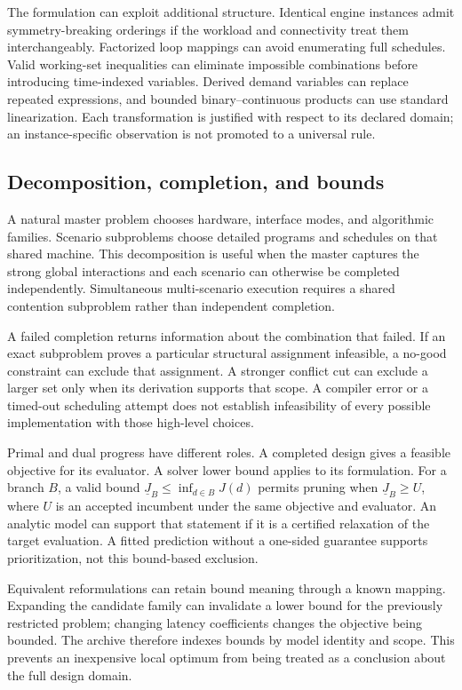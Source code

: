 The formulation can exploit additional structure. Identical engine instances admit symmetry-breaking orderings if the workload and connectivity treat them interchangeably. Factorized loop mappings can avoid enumerating full schedules. Valid working-set inequalities can eliminate impossible combinations before introducing time-indexed variables. Derived demand variables can replace repeated expressions, and bounded binary--continuous products can use standard linearization. Each transformation is justified with respect to its declared domain; an instance-specific observation is not promoted to a universal rule.

\subsection{Decomposition, completion, and bounds}
A natural master problem chooses hardware, interface modes, and algorithmic families. Scenario subproblems choose detailed programs and schedules on that shared machine. This decomposition is useful when the master captures the strong global interactions and each scenario can otherwise be completed independently. Simultaneous multi-scenario execution requires a shared contention subproblem rather than independent completion.

A failed completion returns information about the combination that failed. If an exact subproblem proves a particular structural assignment infeasible, a no-good constraint can exclude that assignment. A stronger conflict cut can exclude a larger set only when its derivation supports that scope. A compiler error or a timed-out scheduling attempt does not establish infeasibility of every possible implementation with those high-level choices.

Primal and dual progress have different roles. A completed design gives a feasible objective for its evaluator. A solver lower bound applies to its formulation. For a branch $B$, a valid bound $\underline J_B\le\inf_{d\in B}J(d)$ permits pruning when $\underline J_B\ge U$, where $U$ is an accepted incumbent under the same objective and evaluator. An analytic model can support that statement if it is a certified relaxation of the target evaluation. A fitted prediction without a one-sided guarantee supports prioritization, not this bound-based exclusion.

Equivalent reformulations can retain bound meaning through a known mapping. Expanding the candidate family can invalidate a lower bound for the previously restricted problem; changing latency coefficients changes the objective being bounded. The archive therefore indexes bounds by model identity and scope. This prevents an inexpensive local optimum from being treated as a conclusion about the full design domain.


